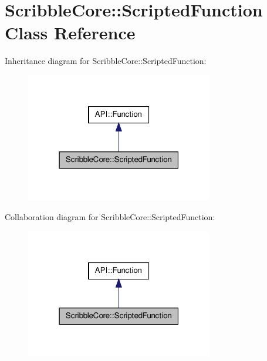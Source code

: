 \hypertarget{class_scribble_core_1_1_scripted_function}{\section{Scribble\-Core\-:\-:Scripted\-Function Class Reference}
\label{class_scribble_core_1_1_scripted_function}
}


Inheritance diagram for Scribble\-Core\-:\-:Scripted\-Function\-:\nopagebreak
\begin{figure}[H]
\begin{center}
\leavevmode
\includegraphics[width=232pt]{class_scribble_core_1_1_scripted_function__inherit__graph}
\end{center}
\end{figure}


Collaboration diagram for Scribble\-Core\-:\-:Scripted\-Function\-:\nopagebreak
\begin{figure}[H]
\begin{center}
\leavevmode
\includegraphics[width=232pt]{class_scribble_core_1_1_scripted_function__coll__graph}
\end{center}
\end{figure}
